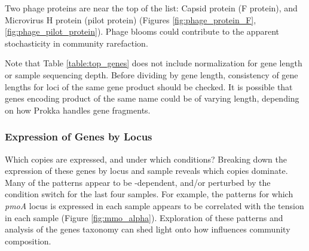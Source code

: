 Two phage proteins are near the top of the list: Capsid protein (F protein), and Microvirus H protein (pilot protein) (Figures \ref{fig:phage_protein_F}, \ref{fig:phage_pilot_protein}). %
Phage blooms could contribute to the apparent stochasticity in community rarefaction.

Note that Table \ref{table:top_genes} does not include normalization for gene length or sample sequencing depth.
Before dividing by gene length, consistency of gene lengths for loci of the same gene product should be checked.
It is possible that genes encoding product of the same name could be of varying length, depending on how Prokka handles gene fragments.

\subsubsection{Expression of Genes by Locus}    %

Which copies are expressed, and under which conditions?
Breaking down the expression of these genes by locus and sample reveals which copies dominate.
Many of the patterns appear to be -dependent, and/or perturbed by the  condition switch for the last four samples.
For example, the patterns for which \textit{pmoA} locus is expressed in each sample appears to be correlated with the  tension in each sample (Figure \ref{fig:mmo_alpha}).
Exploration of these patterns and analysis of the genes taxonomy can shed light onto how  influences community composition.


